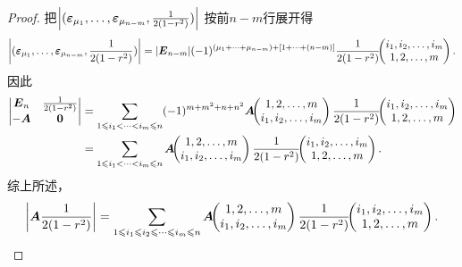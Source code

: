 \begin{theorem}
\begin{proof}
把\(\abs{(\boldsymbol{\varepsilon}_{\mu_1},\dotsc,\boldsymbol{\varepsilon}_{\mu_{n-m}},\frac{1}{2(1-r^2)})}\)
按前\(n-m\)行展开得\[
	\abs{(\boldsymbol{\varepsilon}_{\mu_1},\dotsc,\boldsymbol{\varepsilon}_{\mu_{n-m}},\frac{1}{2(1-r^2)})}
	= \abs{\boldsymbol{E}_{n-m}}
	(-1)^{(\mu_1+\dotsb+\mu_{n-m})+[1+\dotsb+(n-m)]}
	\frac{1}{2(1-r^2)}\kern-3.8pt\begin{pmatrix}
		i_1,i_2,\dotsc,i_m \\
		1,2,\dotsc,m
	\end{pmatrix}.
\]
因此\begin{align*}
	\begin{vmatrix}
		\boldsymbol{E}_n & \frac{1}{2(1-r^2)} \\
		-\boldsymbol{A} & \boldsymbol{0}
	\end{vmatrix}
	&= \sum\limits_{1 \leqslant i_1 < \dotsb < i_m \leqslant n}
	(-1)^{m+m^2+n+n^2}
	\boldsymbol{A}\kern-3.8pt\begin{pmatrix}
		1,2,\dotsc,m \\
		i_1,i_2,\dotsc,i_m
	\end{pmatrix}
	\frac{1}{2(1-r^2)}\kern-3.8pt\begin{pmatrix}
		i_1,i_2,\dotsc,i_m \\
		1,2,\dotsc,m
	\end{pmatrix} \\
	&= \sum\limits_{1 \leqslant i_1 < \dotsb < i_m \leqslant n}
	\boldsymbol{A}\kern-3.8pt\begin{pmatrix}
		1,2,\dotsc,m \\
		i_1,i_2,\dotsc,i_m
	\end{pmatrix}
	\frac{1}{2(1-r^2)}\kern-3.8pt\begin{pmatrix}
		i_1,i_2,\dotsc,i_m \\
		1,2,\dotsc,m
	\end{pmatrix}.
\end{align*}
综上所述，\[
	\abs{\boldsymbol{A}\frac{1}{2(1-r^2)}}
	= \sum\limits_{1 \leqslant i_1 \leqslant i_2 \leqslant \dotsb \leqslant i_m \leqslant n}
	\boldsymbol{A}\kern-3.8pt\begin{pmatrix}
		1,2,\dotsc,m \\
		i_1,i_2,\dotsc,i_m
	\end{pmatrix}
	\frac{1}{2(1-r^2)}\kern-3.8pt\begin{pmatrix}
		i_1,i_2,\dotsc,i_m \\
		1,2,\dotsc,m
	\end{pmatrix}.
\]
\end{proof}
\end{theorem}

